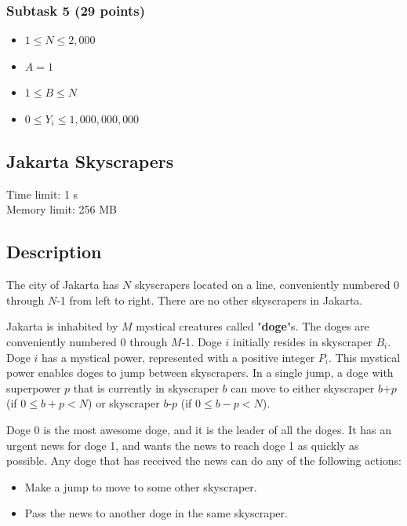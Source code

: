 \documentclass[a4paper]{article}
\begin{document}
\subsubsection*{Subtask 5 (29 points)}
\begin{itemize} \itemsep1pt \parskip0pt
\item $1 \le N \le 2,000$
\item $A = 1$
\item $1 \le B \le N$
\item $0 \le Y_i \le 1,000,000,000$
\end{itemize}

\newpage
\begin{center}
\section*{Jakarta Skyscrapers}
Time limit: 1 s\\
Memory limit: 256 MB
\end{center}

\subsection*{Description}

The city of Jakarta has $N$ skyscrapers located on a line, conveniently numbered 0 through $N$-1 from left to right. There are no other skyscrapers in Jakarta.

Jakarta is inhabited by $M$ mystical creatures called "\textbf{doge}"s. The doges are conveniently numbered 0 through $M$-1. Doge $i$ initially resides in skyscraper $B_i$. Doge $i$ has a mystical power, represented with a positive integer $P_i$. This mystical power enables doges to jump between skyscrapers. In a single jump, a doge with superpower $p$ that is currently in skyscraper $b$ can move to either skyscraper $b$+$p$ (if $0 \le b+p < N$) or skyscraper $b$-$p$ (if $0 \le b-p < N$).

Doge 0 is the most awesome doge, and it is the leader of all the doges. It has an urgent news for doge 1, and wants the news to reach doge 1 as quickly as possible. Any doge that has received the news can do any of the following actions:

\begin{itemize} \parskip0pt \itemsep1pt
\item Make a jump to move to some other skyscraper.
\item Pass the news to another doge in the same skyscraper.
\end{itemize}
\end{document}
